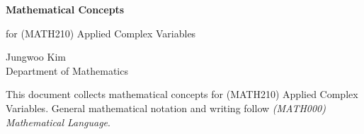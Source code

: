 \documentclass[11pt,oneside]{article}
\begin{document}
\thispagestyle{empty}

\begin{center}
    \vspace*{1.1cm}

    {\LARGE\bfseries Mathematical Concepts\par}

    \vspace{0.25cm}

    {\large for (MATH210) Applied Complex Variables\par}

    \vspace{0.75cm}

    {\normalsize
    Jungwoo Kim\\
    Department of Mathematics\\
    \PohangUniversityOfScienceAndTechnology
    \par}
\end{center}

\vspace{0.45cm}

This document collects mathematical concepts for (MATH210) Applied Complex Variables. General mathematical notation and writing follow \textit{(MATH000) Mathematical Language}.
\end{document}
